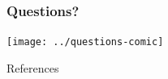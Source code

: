 \documentclass[handout]{beamer}
\renewcommand{\(}{\begin{columns}}
\renewcommand{\)}{\end{columns}}
\newcommand{\<}[1]{\begin{column}{#1}}
\renewcommand{\>}{\end{column}}
\begin{document}
\section*{}
\begin{frame}[fragile]
  \frametitle{Questions?}
  \begin{center}
  \texttt{[image: ../questions-comic]}  
  \end{center}
  
\end{frame}

\begin{frame}[allowframebreaks]{References}
	
	
\end{frame}
\end{document}

